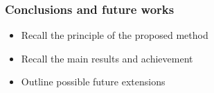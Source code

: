 \begin{frame}
	\frametitle{Conclusions and future works}
	
\begin{itemize}
	\item Recall the principle of the proposed method
	\item Recall the main results and achievement
	\item Outline possible future extensions
\end{itemize}
\end{frame}